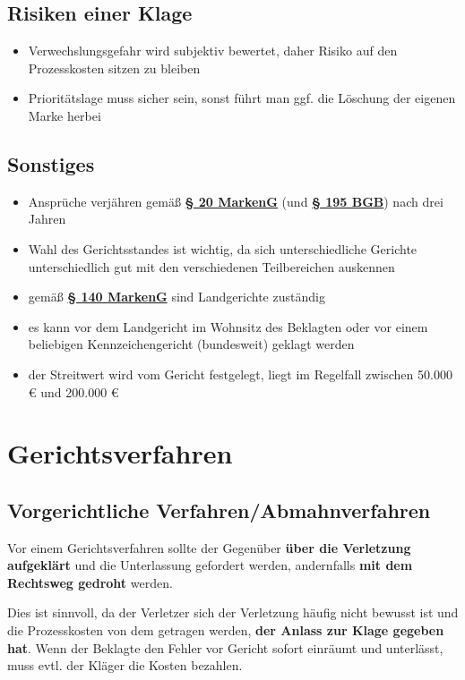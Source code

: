 \documentclass[12pt,A4]{extarticle}
\newcommand{\markenG}[2][]{\textbf{\textcolor{markenGesetzLink}{\href{https://www.gesetze-im-internet.de/markeng/__#2.html}{§ #2 \ifthenelse{\equal{#1}{}}{}{#1 }MarkenG}}}}
\newcommand{\bgb}[2][]{\textbf{\textcolor{markenGesetzLink}{\href{https://www.gesetze-im-internet.de/bgb/__#2.html}{§ #2 \ifthenelse{\equal{#1}{}}{}{#1 }BGB}}}}
\begin{document}
\subsection{Risiken einer Klage}
\begin{itemize}
  \item{Verwechslungsgefahr wird subjektiv bewertet, daher Risiko auf den Prozesskosten sitzen zu bleiben}
  \item{Prioritätslage muss sicher sein, sonst führt man ggf. die Löschung der eigenen Marke herbei}
\end{itemize}

\subsection{Sonstiges}
\begin{itemize}
  \item{Ansprüche verjähren gemäß \markenG{20} (und \bgb{195}) nach drei Jahren}
  \item{Wahl des Gerichtsstandes ist wichtig, da sich unterschiedliche Gerichte unterschiedlich gut mit den verschiedenen Teilbereichen auskennen}
  \item{gemäß \markenG{140} sind Landgerichte zuständig}
  \item{es kann vor dem Landgericht im Wohnsitz des Beklagten oder vor einem beliebigen Kennzeichengericht (bundesweit) geklagt werden}
  \item{der Streitwert wird vom Gericht festgelegt, liegt im Regelfall zwischen 50.000 € und 200.000 €}
\end{itemize}

\section{Gerichtsverfahren}
\subsection{Vorgerichtliche Verfahren/Abmahnverfahren}
Vor einem Gerichtsverfahren sollte der Gegenüber \textbf{über die Verletzung aufgeklärt} und die Unterlassung gefordert werden, andernfalls \textbf{mit dem Rechtsweg gedroht} werden.\par
Dies ist sinnvoll, da der Verletzer sich der Verletzung häufig nicht bewusst ist und die Prozesskosten von dem getragen werden, \textbf{der Anlass zur Klage gegeben hat}. Wenn der Beklagte den Fehler vor Gericht sofort einräumt und unterlässt, muss evtl. der Kläger die Kosten bezahlen.
\end{document}
